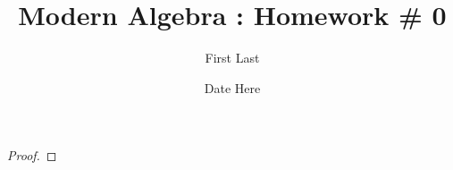 \documentclass{article}
\begin{document}
\title{Modern Algebra : Homework \# 0}
\date{Date Here} %
\author{First Last}
\maketitle

\setcounter{section}{1}
\setcounter{question}{1}
\begin{question} 
\begin{solution} \kant[1]

\begin{lem}
\kant[2]
\begin{proof}
\kant[3]
\end{proof}
\end{lem}
\end{solution}
\end{question} \vspace{2em}
\end{document}
